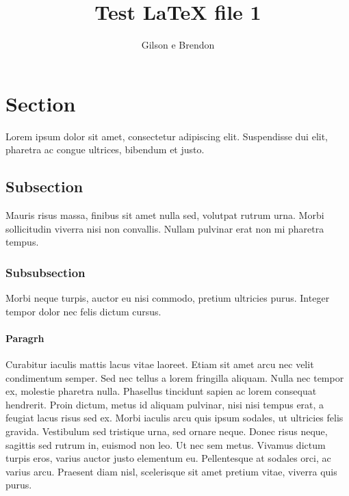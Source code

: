 \documentclass[12pt]{article}
\title{Test LaTeX file 1}
\author{Gilson e Brendon}
\begin{document}
\maketitle

\section{Section}

Lorem ipsum dolor sit amet, consectetur adipiscing elit. Suspendisse dui elit, pharetra ac congue ultrices, bibendum et justo. 

\subsection{Subsection}

Mauris risus massa, finibus sit amet nulla sed, volutpat rutrum urna. Morbi sollicitudin viverra nisi non convallis. Nullam pulvinar erat non mi pharetra tempus. 

\subsubsection{Subsubsection}

Morbi neque turpis, auctor eu nisi commodo, pretium ultricies purus. Integer tempor dolor nec felis dictum cursus. 

\paragraph{Paragrh} 

Curabitur iaculis mattis lacus vitae laoreet. Etiam sit amet arcu nec velit condimentum semper. Sed nec tellus a lorem fringilla aliquam. Nulla nec tempor ex, molestie pharetra nulla. Phasellus tincidunt sapien ac lorem consequat hendrerit. Proin dictum, metus id aliquam pulvinar, nisi nisi tempus erat, a feugiat lacus risus sed ex. Morbi iaculis arcu quis ipsum sodales, ut ultricies felis gravida. Vestibulum sed tristique urna, sed ornare neque. Donec risus neque, sagittis sed rutrum in, euismod non leo. Ut nec sem metus. Vivamus dictum turpis eros, varius auctor justo elementum eu. Pellentesque at sodales orci, ac varius arcu. Praesent diam nisl, scelerisque sit amet pretium vitae, viverra quis purus.
\end{document}
